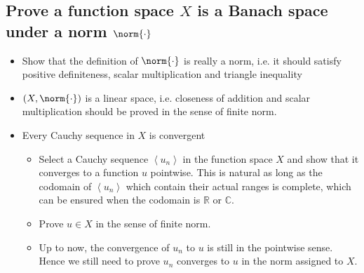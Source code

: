 \subsection{Prove a function space $X$ is a Banach space under a norm $\norm{\cdot}$}

\begin{itemize}
\item Show that the definition of $\norm{\cdot}$ is really a norm, i.e. it should satisfy positive
  definiteness, scalar multiplication and triangle inequality
\item $(X,\norm{\cdot})$ is a linear space, i.e. closeness of addition and scalar multiplication
  should be proved in the sense of finite norm.
\item Every Cauchy sequence in $X$ is convergent
  \begin{itemize}
  \item Select a Cauchy sequence $\left\langle u_n \right\rangle$ in the function space $X$ and show that it converges
    to a function $u$ pointwise. This is natural as long as the codomain of $\left\langle u_n \right\rangle$ which
    contain their actual ranges is complete, which can be ensured when the codomain is $\mathbb{R}$ or
    $\mathbb{C}$.
  \item Prove $u \in X$ in the sense of finite norm.
  \item Up to now, the convergence of $u_n$ to $u$ is still in the pointwise sense. Hence we still
    need to prove $u_n$ converges to $u$ in the norm assigned to $X$.
  \end{itemize}
\end{itemize}
